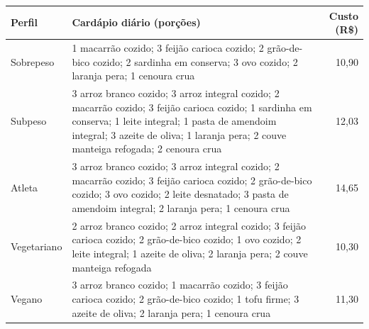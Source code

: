 \begin{tabular}{p{2.3cm}p{9.7cm}r}
\toprule
Perfil & Cardápio diário (porções) & Custo (R\$) \\
\midrule
Sobrepeso & 1 macarrão cozido; 3 feijão carioca cozido; 2 grão-de-bico cozido; 2 sardinha em conserva; 3 ovo cozido; 2 laranja pera; 1 cenoura crua & 10{,}90 \\[2pt]
Subpeso & 3 arroz branco cozido; 3 arroz integral cozido; 2 macarrão cozido; 3 feijão carioca cozido; 1 sardinha em conserva; 1 leite integral; 1 pasta de amendoim integral; 3 azeite de oliva; 1 laranja pera; 2 couve manteiga refogada; 2 cenoura crua & 12{,}03 \\[2pt]
Atleta & 3 arroz branco cozido; 3 arroz integral cozido; 2 macarrão cozido; 3 feijão carioca cozido; 2 grão-de-bico cozido; 3 ovo cozido; 2 leite desnatado; 3 pasta de amendoim integral; 2 laranja pera; 1 cenoura crua & 14{,}65 \\[2pt]
Vegetariano & 2 arroz branco cozido; 2 arroz integral cozido; 3 feijão carioca cozido; 2 grão-de-bico cozido; 1 ovo cozido; 2 leite integral; 1 azeite de oliva; 2 laranja pera; 2 couve manteiga refogada & 10{,}30 \\[2pt]
Vegano & 3 arroz branco cozido; 1 macarrão cozido; 3 feijão carioca cozido; 2 grão-de-bico cozido; 1 tofu firme; 3 azeite de oliva; 2 laranja pera; 1 cenoura crua & 11{,}30 \\[2pt]
\bottomrule
\end{tabular}
